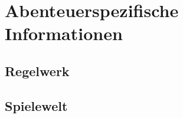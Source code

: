 
\section*{Abenteuerspezifische Informationen}

\subsection*{Regelwerk}
\label{ssec:rules}

\subsection*{Spielewelt}
\label{ssec:world}

